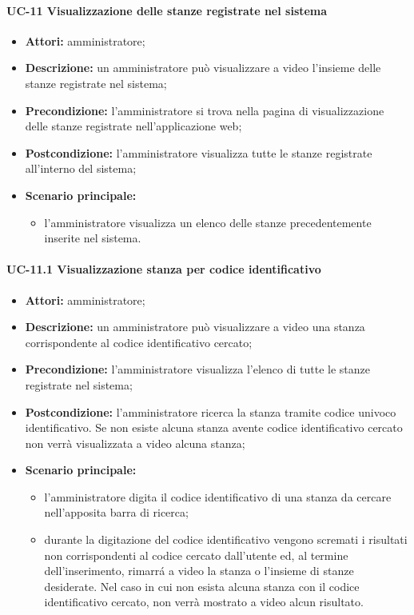 \paragraph{UC-11 Visualizzazione delle stanze registrate nel sistema}
\begin{itemize}
    \item \textbf{Attori:} amministratore;
    \item \textbf{Descrizione:} un amministratore pu\`{o} visualizzare a video l'insieme delle stanze registrate nel sistema;
    \item \textbf{Precondizione:} l'amministratore si trova nella pagina di visualizzazione delle stanze registrate nell'applicazione web;
    \item \textbf{Postcondizione:} l'amministratore visualizza tutte le stanze registrate all'interno del sistema;
    \item \textbf{Scenario principale:}
    \begin{itemize}
        \item l'amministratore visualizza un elenco delle stanze precedentemente inserite nel sistema.
    \end{itemize}
\end{itemize}


\paragraph{UC-11.1 Visualizzazione stanza per codice identificativo}
\begin{itemize}
    \item \textbf{Attori:} amministratore;
    \item \textbf{Descrizione:} un amministratore pu\`{o} visualizzare a video una stanza corrispondente al codice identificativo cercato;
    \item \textbf{Precondizione:} l'amministratore visualizza l'elenco di tutte le stanze registrate nel sistema;
    \item \textbf{Postcondizione:} l'amministratore ricerca la stanza tramite codice univoco identificativo. Se non esiste alcuna stanza avente codice identificativo cercato non verrà visualizzata a video alcuna stanza;
    \item \textbf{Scenario principale:}
    \begin{itemize}
        \item l'amministratore digita il codice identificativo di una stanza da cercare nell'apposita barra di ricerca;
        \item durante la digitazione del codice identificativo vengono scremati i risultati non corrispondenti al codice cercato dall'utente ed, al termine dell'inserimento, rimarr\'{a} a video la stanza o l'insieme di stanze desiderate. Nel caso in cui non esista alcuna stanza con il codice identificativo cercato, non verrà mostrato a video alcun risultato.
    \end{itemize}
\end{itemize}

